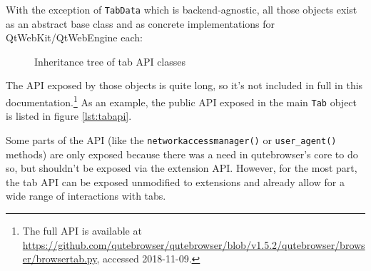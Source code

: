 \documentclass[a4paper,parskip=full]{scrreprt}
\begin{document}
With the exception of \verb|TabData| which is backend-agnostic, all those
objects exist as an abstract base class and as concrete implementations for
QtWebKit/QtWebEngine each:

\begin{figure}[h]
\begin{center}
\end{center}
\caption{Inheritance tree of tab API classes}
\end{figure}

The API exposed by those objects is quite long, so it's not included in full in
this documentation.\footnote{The full API is available at
  \url{https://github.com/qutebrowser/qutebrowser/blob/v1.5.2/qutebrowser/browser/browsertab.py},
accessed 2018-11-09.} As an example, the public API exposed in the main
\verb|Tab| object is listed in figure \ref{lst:tabapi}.

Some parts of the API (like the \verb|networkaccessmanager()| or
\verb|user_agent()| methods) are only exposed because there was a need in
qutebrowser's core to do so, but shouldn't be exposed via the extension API.
However, for the most part, the tab API can be exposed unmodified to extensions
and already allow for a wide range of interactions with tabs.
\end{document}
